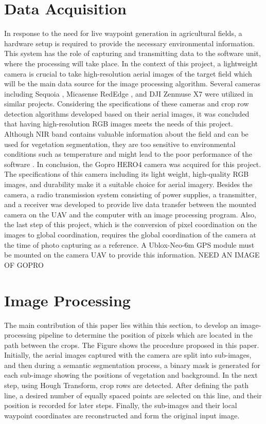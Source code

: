 \documentclass[conference]{IEEEtran}
\begin{document}
\section{Data Acquisition}
In response to the need for live waypoint generation in agricultural fields, a hardware setup is required to provide the necessary environmental information. This system has the role of capturing and transmitting data to the software unit, where the processing will take place. In the context of this project, a lightweight camera is crucial to take high-resolution aerial images of the target field which will be the main data source for the image processing algorithm. Several cameras including Sequoia 
\cite{b9,b4,b7,b6}
, Micasense RedEdge
\cite{b9,b14}, and DJI Zenmuse X7
\cite{b5} were utilized in similar projects. Considering the specifications of these cameras and crop row detection algorithms developed based on their aerial images, it was concluded that having high-resolution RGB images meets the needs of this project. Although NIR band contains valuable information about the field and can be used for vegetation segmentation, they are too sensitive to environmental conditions such as temperature and might lead to the poor performance of the software
\cite{b5}. In conclusion, the Gopro HERO4 camera was acquired for this project. The specifications of this camera including its light weight, high-quality RGB images, and durability make it a suitable choice for aerial imagery. 
Besides the camera, a radio transmission system consisting of power supplies, a transmitter, and a receiver was developed to provide live data transfer between the mounted camera on the UAV and the computer with an image processing program. 
Also, the last step of this project, which is the conversion of pixel coordination on the images to global coordination, requires the global coordination of the camera at the time of photo capturing as a reference. A Ublox-Neo-6m GPS module must be mounted on the camera UAV to provide this information.
NEED AN IMAGE OF GOPRO


\section{Image Processing}
The main contribution of this paper lies within this section, to develop an image-processing pipeline to determine the position of pixels which are located in the path between the crops. The Figure shows the procedure proposed in this paper. Initially, the aerial images captured with the camera are split into sub-images, and then during a semantic segmentation process, a binary mask is generated for each sub-image showing the positions of vegetation and background. In the next step, using Hough Transform, crop rows are detected. After defining the path line, a desired number of equally spaced points are selected on this line, and their position is recorded for later steps. Finally, the sub-images and their local waypoint coordinates are reconstructed and form the original input image.
\end{document}
